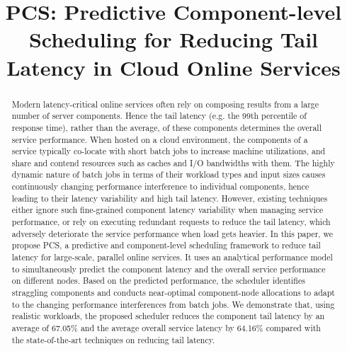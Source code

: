 \documentclass[10pt, conference, compsocconf]{IEEEtran}
\begin{document}
\title{PCS: Predictive Component-level Scheduling for Reducing Tail Latency in Cloud Online Services}



\author{
\and
{}
}

\maketitle



\begin{abstract}
Modern latency-critical online services often rely on composing results from a large number of server components. Hence the tail latency (e.g. the 99th percentile of response time), rather than the average, of these components determines the overall service performance. When hosted on a cloud environment, the components of a service typically co-locate with short batch jobs to increase machine utilizations, and share and contend resources such as caches and I/O bandwidths with them. The highly dynamic nature of batch jobs in terms of their workload types and input sizes causes continuously changing performance interference to individual components, hence leading to their latency variability and high tail latency.
However, existing techniques either ignore such fine-grained component latency variability when managing service performance, or rely on executing redundant requests to reduce the tail latency, which adversely deteriorate the service performance when load gets heavier.
In this paper, we propose PCS, a predictive and component-level scheduling framework to reduce tail latency for large-scale, parallel online services. It uses an analytical performance model to simultaneously predict the component latency and the overall service performance on different nodes. Based on the predicted performance, the scheduler identifies straggling components and conducts near-optimal component-node allocations to adapt to the changing performance interferences from batch jobs. We demonstrate that, using realistic workloads, the proposed scheduler reduces the component tail latency by an average of 67.05\% and the average overall service latency by 64.16\% compared with the state-of-the-art techniques on reducing tail latency.
\end{abstract}
\end{document}
